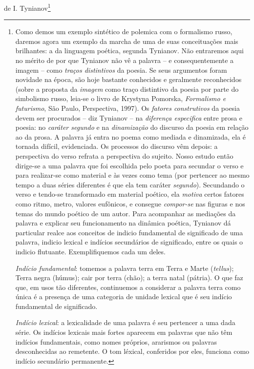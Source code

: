 de I. Tynianov\footnote{Como demos um exemplo sintético de polemica com
  o formalismo russo, daremos agora um exemplo da marcha de uma de suas
  conceituações mais brilhantes: a da linguagem poética, segunda
  Tynianov. Não entraremos aqui no mérito de por que Tynianov não vê a
  palavra -- e consequentemente a imagem -- como \emph{traços
  distintivos} da poesia. Se seus argumentos foram novidade na época,
  são hoje bastante conhecidos e geralmente reconhecidos (sobre a
  proposta da \emph{imagem} como traço distintivo da poesia por parte do
  simbolismo russo, leia-se o livro de Krystyna Pomorska,
  \emph{Formalismo e futurismo}, São Paulo, Perspectiva, 1997). Os
  \emph{fatores construtivos} da poesia devem ser procurados -- diz
  Tynianov -- na \emph{diferença especifica} entre prosa e poesia: no
  \emph{caráter segundo} e na \emph{dinamização} do discurso da poesia
  em relação ao da prosa. A palavra já entra no poema como mediada e
  dinamizada, ela é tornada difícil, evidenciada. Os processos do
  discurso vêm depois: a perspectiva do verso refrata a perspectiva do
  sujeito. Nosso estudo então dirige-se a uma palavra que foi escolhida
  pelo poeta para secundar o verso e para realizar-se como material e às
  vezes como tema (por pertencer ao mesmo tempo a duas séries diferentes
  é que ela tem caráter \emph{segundo}). Secundando o verso e tendo-se
  transformado em material poético, ela \emph{motiva} certos fatores
  como ritmo, metro, valores eufônicos, e consegue \emph{compor-se} nas
  figuras e nos temas do mundo poético de um autor. Para acompanhar as
  mediações da palavra e explicar seu funcionamento na dinâmica poética,
  Tynianov dá particular realce aos conceitos de indicio fundamental de
  significado de uma palavra, indicio lexical e indícios secundários de
  significado, entre os quais o indicio flutuante. Exemplifiquemos cada
  um deles.

  \emph{Indício fundamental}: tomemos a palavra terra em Terra e Marte
  (\emph{tellus}); Terra negra (húmus); cair por terra (chão); a terra
  natal (pátria). O que faz que, em usos tão diferentes, continuemos a
  considerar a palavra terra como única é a presença de uma categoria de
  unidade lexical que é seu indício fundamental de significado.

  \emph{Indício lexical}: a lexicalidade de uma palavra é seu pertencer
  a uma dada série. Os indícios lexicais mais fortes aparecem em
  palavras que não têm indícios fundamentais, como nomes próprios,
  ararismos ou palavras desconhecidas ao remetente. O tom léxical,
  conferidos por eles, funciona como indício secundário permanente.

}
